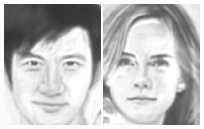 \documentclass[10pt,twocolumn,letterpaper]{article}
\begin{document}
\begin{figure}[htbp]
{\begin{minipage}[b]{0.22\linewidth}
\includegraphics[width=0.99\linewidth]{img/real_world_photos/fcnn_r2.png}
\includegraphics[width=0.99\linewidth]{img/real_world_photos/fcnn_r3.png}

\end{minipage}}
\end{figure}
\end{document}
